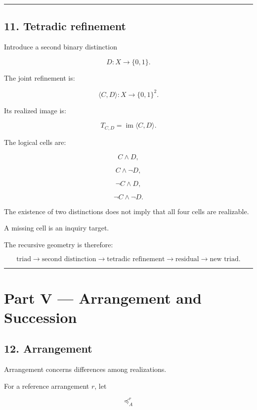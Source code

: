 \documentclass[
]{article}
\begin{document}
\begin{center}\rule{0.5\linewidth}{0.5pt}\end{center}

\subsection{11. Tetradic refinement}\label{tetradic-refinement}

Introduce a second binary distinction

\[
D:X\to\{0,1\}.
\]

The joint refinement is:

\[
\boxed{
\langle C,D\rangle
:
X\to\{0,1\}^2.
}
\]

Its realized image is:

\[
\boxed{
T_{C,D}
=
\operatorname{im}\langle C,D\rangle.
}
\]

The logical cells are:

\[
C\land D,
\]

\[
C\land\neg D,
\]

\[
\neg C\land D,
\]

\[
\neg C\land\neg D.
\]

The existence of two distinctions does not imply that all four cells are
realizable.

A missing cell is an inquiry target.

The recursive geometry is therefore:

\[
\boxed{
\text{triad}
\to
\text{second distinction}
\to
\text{tetradic refinement}
\to
\text{residual}
\to
\text{new triad}.
}
\]

\begin{center}\rule{0.5\linewidth}{0.5pt}\end{center}

\section{Part V --- Arrangement and
Succession}\label{part-v-arrangement-and-succession}

\subsection{12. Arrangement}\label{arrangement}

Arrangement concerns differences among realizations.

For a reference arrangement \(r\), let

\[
\preceq_A^r
\]
\end{document}
